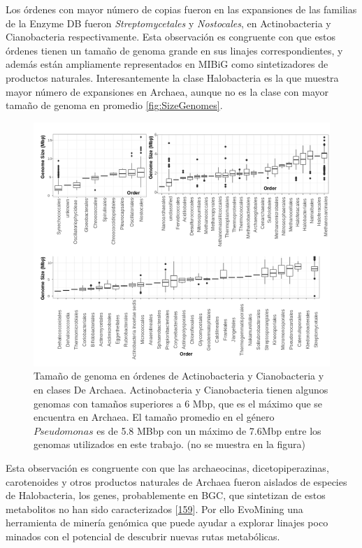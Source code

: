 \documentclass[12pt,twoside]{reedthesis}
\begin{document}
  Los órdenes con mayor número de copias fueron en las expansiones de las
  familias de la Enzyme DB fueron \emph{Streptomycetales} y
  \emph{Nostocales}, en Actinobacteria y Cianobacteria respectivamente.
  Esta observación es congruente con que estos órdenes tienen un tamaño de
  genoma grande en sus linajes correspondientes, y además están
  ampliamente representados en MIBiG como sintetizadores de productos
  naturales. Interesantemente la clase Halobacteria es la que muestra
  mayor número de expansiones en Archaea, aunque no es la clase con mayor
  tamaño de genoma en promedio \autoref{fig:SizeGenomes}.
  
  \begin{figure}[h!tbp]
  \centering
  \includegraphics[angle = 0,scale = .5]{chapter2/Genomesize.png}
  \caption[Tamaño de genoma en órdenes de Actinobacteria y Cianobacteria y en clases De Archaea.]{\footnotesize{Tamaño de genoma en órdenes de Actinobacteria y Cianobacteria y en clases De Archaea. Actinobacteria y Cianobacteria tienen algunos genomas con tamaños superiores a 6 Mbp, que es el máximo que se encuentra en Archaea. El tamaño promedio en el género $Pseudomonas$ es de 5.8 MBbp con un máximo de 7.6Mbp entre los genomas utilizados en este trabajo.
  (no se muestra en la figura)}}
  \label{fig:SizeGenomes}
  \end{figure}
  
  Esta observación es congruente con que las archaeocinas,
  dicetopiperazinas, carotenoides y otros productos naturales de Archaea
  fueron aislados de especies de Halobacteria, los genes, probablemente en
  BGC, que sintetizan de estos metabolitos no han sido caracterizados
  {[}\protect\hyperlink{ref-charlesworth_untapped_natural_products_Archaea_2015}{159}{]}.
  Por ello EvoMining una herramienta de minería genómica que puede ayudar
  a explorar linajes poco minados con el potencial de descubrir nuevas
  rutas metabólicas.
  
\end{document}
